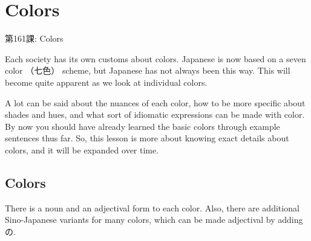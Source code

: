     
\chapter{Colors}

\begin{center}
\begin{Large}
第161課: Colors 
\end{Large}
\end{center}
 
\par{ Each society has its own customs about colors. Japanese is now based on a seven color （七色） scheme, but Japanese has not always been this way. This will become quite apparent as we look at individual colors. }

\par{ A lot can be said about the nuances of each color, how to be more specific about shades and hues, and what sort of idiomatic expressions can be made with color. By now you should have already learned the basic colors through example sentences thus far. So, this lesson is more about knowing exact details about colors, and it will be expanded over time. }
      
\section{Colors}
 
\par{ There is a noun and an adjectival form to each color. Also, there are additional Sino-Japanese variants for many colors, which can be made adjectival by adding の. }

